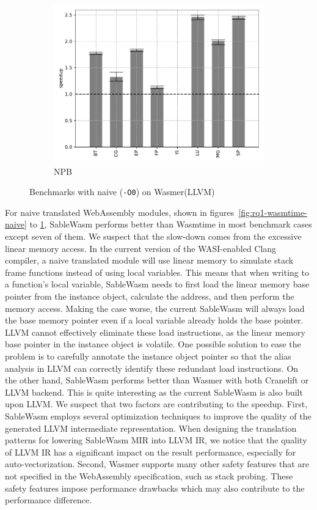 \begin{figure}
\begin{subfigure}[t]{.45\textwidth}
        \includegraphics[width=\textwidth]
        {Images/6.1.RQ1/npb-wasmer-llvm-naive.pdf}
        \caption{NPB}
    \end{subfigure}
    \caption{Benchmarks with naive (\texttt{-O0}) on Wasmer(LLVM)}
    \label{fig:rq1-wasmer-llvm-naive}
\end{figure}

For naive translated WebAssembly modules, shown in
figures~\ref{fig:rq1-wasmtime-naive} to \ref{fig:rq1-wasmer-llvm-naive},
SableWasm performs better than Wasmtime in most benchmark cases except seven
of them. We suspect that the slow-down comes from the excessive linear
memory access. In the current version of the WASI-enabled Clang compiler, a
naive translated module will use linear memory to simulate stack frame functions
instead of using local variables. This means that when writing to a function's
local variable, SableWasm needs to first load the linear memory base pointer
from the instance object, calculate the address, and then perform the memory
access. Making the case worse, the current SableWasm will always load the base
memory pointer even if a local variable already holds the base pointer. LLVM
cannot effectively eliminate these load instructions, as the linear memory base
pointer in the instance object is volatile. One possible solution to ease the
problem is to carefully annotate the instance object pointer so that the alias
analysis in LLVM can correctly identify these redundant load instructions.
On the other hand, SableWasm performs better than Wasmer with both Cranelift
or LLVM backend. This is quite interesting as the current SableWasm
is also built upon LLVM. We suspect that two factors are contributing to the
speedup. First, SableWasm employs several optimization techniques to improve
the quality of the generated LLVM intermediate representation. When designing
the translation patterns for lowering SableWasm MIR into LLVM IR, we notice
that the quality of LLVM IR has a significant impact on the result performance,
especially for auto-vectorization. Second, Wasmer supports many other safety
features that are not specified in the WebAssembly specification, such as
stack probing. These safety features impose performance drawbacks which may
also contribute to the performance difference.

